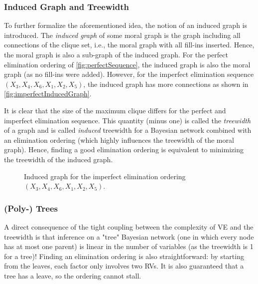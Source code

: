 			\subsubsection{Induced Graph and Treewidth}
				To further formalize the aforementioned idea, the notion of an induced graph is introduced. The \emph{induced graph} of some moral graph is the graph including all connections of the clique set, i.e., the moral graph with all fill-ins inserted. Hence, the moral graph is also a sub-graph of the induced graph. For the perfect elimination ordering of \autoref{fig:perfectSequence}, the induced graph is also the moral graph (as no fill-ins were added). However, for the imperfect elimination sequence \( (X_3, X_4, X_6, X_1, X_2, X_5) \), the induced graph has more connections as shown in \autoref{fig:imperfectInducedGraph}.

				It is clear that the size of the maximum clique differs for the perfect and imperfect elimination sequence. This quantity (minus one) is called the \emph{treewidth} of a graph and is called \emph{induced} treewidth for a Bayesian network combined with an elimination ordering (which highly influences the treewidth of the moral graph). Hence, finding a good elimination ordering is equivalent to minimizing the treewidth of the induced graph.

				\begin{figure}
					\centering
					\caption[Induced Graph for Imperfect Elimination Ordering]{Induced graph for the imperfect elimination ordering \( (X_3, X_4, X_6, X_1, X_2, X_5) \).}
					\label{fig:imperfectInducedGraph}
				\end{figure}

			\subsubsection{(Poly-) Trees}
				A direct consequence of the tight coupling between the complexity of VE and the treewidth is that inference on a "tree" Bayesian network (one in which every node has at most one parent) is linear in the number of variables (as the treewidth is \num{1} for a tree)! Finding an elimination ordering is also straightforward: by starting from the leaves, each factor only involves two RVs. It is also guaranteed that a tree has a leave, so the ordering cannot stall.

